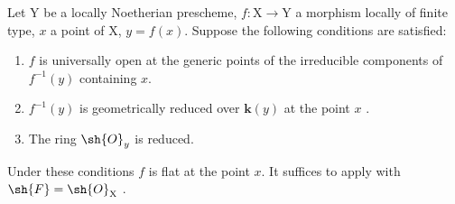 \begin{corollary}[15.2.3]
\label{IV.15.2.3}
Let $\mathrm{Y}$ be a locally Noetherian prescheme, $f:\mathrm{X}\to\mathrm{Y}$ a morphism locally of finite type, $x$ a point of $\mathrm{X}$, $y=f(x)$.
Suppose the following conditions are satisfied:
\begin{enumerate}[label=(\roman*)]
  \item $f$ is universally open at the generic points of the irreducible components of $f^{-1}(y)$ containing $x$.
  \item $f^{-1}(y)$ is geometrically reduced over $\mathbf{k}(y)$ at the point $x$ .
  \item The ring $\sh{O}_y$ is reduced.
\end{enumerate}
Under these conditions $f$ is flat at the point $x$.
It suffices to apply  with $\sh{F}=\sh{O}_\mathrm{X}$ .
\end{corollary}

